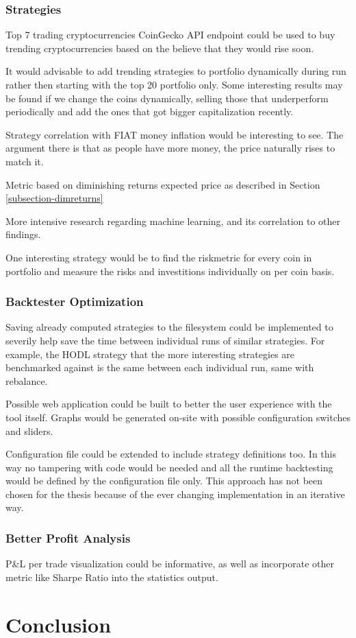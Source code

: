 \subsection*{Strategies}
Top 7 trading cryptocurrencies CoinGecko API endpoint could be used to buy trending cryptocurrencies based on the believe that they would rise soon.

It would advisable to add trending strategies to portfolio dynamically during run rather then starting with the top 20 portfolio only. Some interesting results may be found if we change the coins dynamically, selling those that underperform periodically and add the ones that got bigger capitalization recently.

Strategy correlation with FIAT money inflation would be interesting to see. The argument there is that as people have more money, the price naturally rises to match it.

Metric based on diminishing returns expected price as described in Section \ref{subsection-dimreturns}

More intensive research regarding machine learning, and its correlation to other findings.

One interesting strategy would be to find the riskmetric for every coin in portfolio and measure the risks and investitions individually on per coin basis.

\subsection*{Backtester Optimization}
Saving already computed strategies to the filesystem could be implemented to severily help save the time between individual runs of similar strategies. For example, the HODL strategy that the more interesting strategies are benchmarked against is the same between each individual run, same with rebalance.

Possible web application could be built to better the user experience with the tool itself. Graphs would be generated on-site with possible configuration switches and sliders.

Configuration file could be extended to include strategy definitions too. In this way no tampering with code would be needed and all the runtime backtesting would be defined by the configuration file only. This approach has not been chosen for the thesis because of the ever changing implementation in an iterative way.

\subsection*{Better Profit Analysis}
P\&L per trade visualization could be informative, as well as incorporate other metric like Sharpe Ratio into the statistics output.

\chapter{Conclusion}
\label{conclusion}
